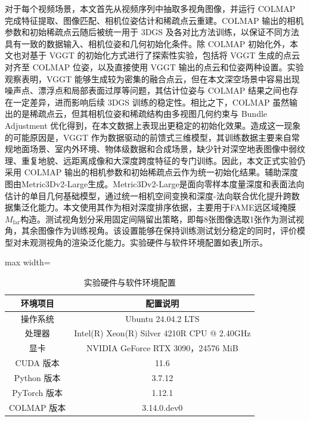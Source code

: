 对于每个视频场景，本文首先从视频序列中抽取多视角图像，并运行 COLMAP 完成特征提取、图像匹配、相机位姿估计和稀疏点云重建。COLMAP 输出的相机参数和初始稀疏点云随后被统一用于 3DGS 及各对比方法训练，以保证不同方法具有一致的数据输入、相机位姿和几何初始化条件。除 COLMAP 初始化外，本文也对基于 VGGT 的初始化方式进行了探索性实验，包括将 VGGT 生成的点云对齐至 COLMAP 位姿，以及直接使用 VGGT 输出的点云和位姿两种设置。实验观察表明，VGGT 能够生成较为密集的融合点云，但在本文深空场景中容易出现噪声点、漂浮点和局部表面过厚等问题，其估计位姿与 COLMAP 结果之间也存在一定差异，进而影响后续 3DGS 训练的稳定性。相比之下，COLMAP 虽然输出的是稀疏点云，但其相机位姿和稀疏结构由多视图几何约束与 Bundle Adjustment 优化得到，在本文数据上表现出更稳定的初始化效果。造成这一现象的可能原因是，VGGT 作为数据驱动的前馈式三维模型，其训练数据主要来自常规地面场景、室内外环境、物体级数据和合成场景，缺少针对深空地表图像中弱纹理、重复地貌、远距离成像和大深度跨度特征的专门训练。因此，本文正式实验仍采用 COLMAP 输出的相机参数和初始稀疏点云作为统一初始化结果。辅助深度图由Metric3Dv2-Large生成。Metric3Dv2-Large是面向零样本度量深度和表面法向估计的单目几何基础模型，通过统一相机空间变换和深度-法向联合优化提升跨数据集泛化能力。本文使用其作为相对深度排序依据，主要用于FAME远区域掩膜$M_{\mathrm{far}}$构造。测试视角划分采用固定间隔留出策略，即每8张图像选取1张作为测试视角，其余图像作为训练视角。该设置能够在保持训练测试划分稳定的同时，评价模型对未观测视角的渲染泛化能力。实验硬件与软件环境配置如表\ref{tab:5-1}所示。

\begin{table}[H]
    \fontsize{10.5pt}{13.125pt}\selectfont
    \caption{实验硬件与软件环境配置}
    \centering\label{tab:5-1}
    \begin{adjustbox}{max width=\textwidth}
    \begin{tabular}{cc}
        \toprule
        环境项目 & 配置说明 \\
        \midrule
        操作系统 & Ubuntu 24.04.2 LTS \\
        处理器 & Intel(R) Xeon(R) Silver 4210R CPU @ 2.40GHz \\
        显卡 & NVIDIA GeForce RTX 3090，24576 MiB \\
        CUDA 版本 & 11.6 \\
        Python 版本 & 3.7.12 \\
        PyTorch 版本 & 1.12.1 \\
        COLMAP 版本 & 3.14.0.dev0 \\
        \bottomrule
    \end{tabular}
    \end{adjustbox}
\end{table}
